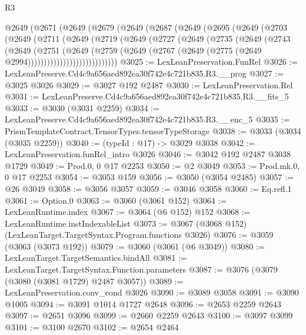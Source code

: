 \begin{lexlean}{R3}
\begin{coremodule}
  @2649
    (@2671
      (@2649
        (@2679
          (@2649
            (@2687
              (@2649
                (@2695
                  (@2649
                    (@2703
                      (@2649
                        (@2711
                          (@2649
                            (@2719
                              (@2649
                                (@2727
                                  (@2649
                                    (@2735
                                      (@2649
                                        (@2743
                                          (@2649
                                            (@2751
                                              (@2649
                                                (@2759
                                                  (@2649
                                                    (@2767
                                                      (@2649
                                                        (@2775
                                                          (@2649 @2994))))))))))))))))))))))))))))
@3025 := LexLeanPreservation.FunRel
@3026 := LexLeanPreserve.Cd4c9a656aed892ea30f742e4c721b835.R3.__prog
@3027 := @3025 @3026
@3029 := @3027 @192 @2487
@3030 := LexLeanPreservation.Rel
@3031 := LexLeanPreserve.Cd4c9a656aed892ea30f742e4c721b835.R3.__fits_5
@3033 := @3030 (@3031 @2259)
@3034 := LexLeanPreserve.Cd4c9a656aed892ea30f742e4c721b835.R3.__enc_5
@3035 := PrismTemplateContract.TensorTypes.tensorTypeStorage
@3038 := @3033 (@3034 (@3035 @2259))
@3040 := (typeId : @17) -> @3029 @3038
@3042 := LexLeanPreservation.funRel_intro @3026
@3046 := @3042 @192 @2487 @3038 @1729
@3049 := Prod.{0, 0} @17 @2253
@3050 := @2 @3049
@3053 := Prod.mk.{0, 0} @17 @2253
@3054 := @3053 @159
@3056 := @3050 (@3054 @2485)
@3057 := @26 @3049
@3058 := @3056 @3057
@3059 := @3046 @3058
@3060 := Eq.refl.{1}
@3061 := Option.{0}
@3063 := @3060 (@3061 @152)
@3064 := LexLeanRuntime.index
@3067 := @3064 (@6 @152) @152
@3068 := LexLeanRuntime.instIndexableList
@3073 := @3067 (@3068 @152) (LexLeanTarget.TargetSyntax.Program.functions @3026)
@3076 := @3059 (@3063 (@3073 @192))
@3079 := @3060 (@3061 (@6 @3049))
@3080 := LexLeanTarget.TargetSemantics.bindAll
@3081 := LexLeanTarget.TargetSyntax.Function.parameters
@3087 := @3076 (@3079 (@3080 (@3081 @1729) @2487 @3057))
@3089 := LexLeanPreservation.conv_cond @3026
@3090 := @3089 @3058
@3091 := @3090 @1005
@3094 := @3091 @1014 @1727 @2648
@3096 := @2653 @2259 @2643
@3097 := @2651 @3096
@3099 := @2660 @2259 @2643
@3100 := @3097 @3099
@3101 := @3100 @2670
@3102 := @2654 @2464

\end{coremodule}
\end{lexlean}
